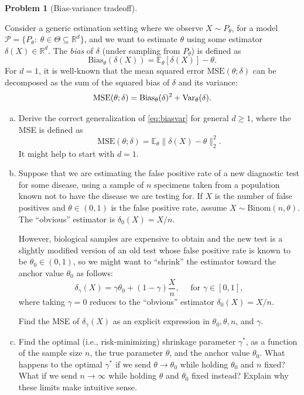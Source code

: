 \documentclass{article}
\newcommand{\cP}{\mathcal{P}}
\newcommand{\EE}{\mathbb{E}}
\newcommand{\RR}{\mathbb{R}}
\newcommand{\Var}{\textnormal{Var}}
\theoremstyle{definition}
\newtheorem{problem}{Problem}
\begin{document}
\begin{problem}[Bias-variance tradeoff]
  \label{prob:bias-var}
  
  Consider a generic estimation setting where we observe $X \sim P_\theta$, for a model $\cP = \{P_\theta:\; \theta \in \Theta \subseteq \RR^d\}$, and we want to estimate $\theta$ using some estimator $\delta(X) \in \RR^d$. The {\em bias} of $\delta$ (under sampling from $P_\theta$) is defined as
  \[
  \text{Bias}_\theta(\delta(X)) = \EE_\theta[\delta(X)] - \theta. 
  \]
  For $d=1$, it is well-known that the mean squared error $\text{MSE}(\theta; \delta)$ can be decomposed as the sum of the squared bias of $\delta$ and its variance:
  \begin{equation}\label{eq:biasvar}
    \text{MSE}(\theta; \delta) = \text{Bias}_\theta(\delta)^2 + \Var_\theta(\delta).
  \end{equation}
  
  
  \begin{enumerate}[(a)]
  \item Derive the correct generalization of \eqref{eq:biasvar} for general $d \geq 1$, where the MSE is defined as
    \[
    \text{MSE}(\theta; \delta) = \EE_\theta \|\delta(X) - \theta\|_2^2.
    \]
    It might help to start with $d=1$.
    
    
    
  \item Suppose that we are estimating the false positive rate of a new diagnostic test for some disease, using a sample of $n$ specimens taken from a population known not to have the disease we are testing for. If $X$ is the number of false positives and $\theta \in (0,1)$ is the false positive rate, assume $X \sim \text{Binom}(n, \theta)$. The ``obvious'' estimator is $\delta_0(X) = X/n$.
    
    However, biological samples are expensive to obtain and the new test is a slightly modified version of an old test whose false positive rate is known to be $\theta_0 \in (0,1)$, so we might want to ``shrink'' the estimator toward the anchor value $\theta_0$ as follows:
    \[
    \delta_{\gamma}(X) = \gamma \theta_0 + (1-\gamma) \frac{X}{n}, \quad \text{ for } \gamma \in [0,1],
    \]
    where taking $\gamma = 0$ reduces to the ``obvious'' estimator $\delta_0(X) = X/n$.
    
    Find the MSE of $\delta_\gamma(X)$ as an explicit expression in $\theta_0, \theta, n$, and $\gamma$.
    
    
    
  \item Find the optimal (i.e., risk-minimizing) shrinkage parameter $\gamma^*$, as a function of the sample size $n$, the true parameter $\theta$, and the anchor value $\theta_0$. What happens to the optimal $\gamma^*$ if we send $\theta \to \theta_0$ while holding $\theta_0$ and $n$ fixed? What if we send $n\to\infty$ while holding $\theta$ and $\theta_0$ fixed instead? Explain why these limits make intuitive sense.


\end{enumerate}
\end{problem}
\end{document}
